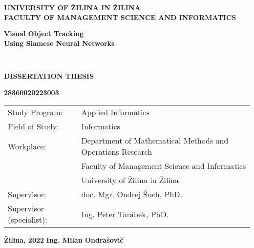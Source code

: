 \begin{titlepage}
    \begin{center}
        \normalsize
        \textbf{UNIVERSITY OF ŽILINA IN ŽILINA}\\
        \textbf{FACULTY OF MANAGEMENT SCIENCE AND INFORMATICS}\\

        \vfill

        \Large
        \textbf{Visual Object Tracking\\Using Siamese Neural Networks}

        \

        \large
        \textbf{DISSERTATION THESIS}

        \textbf{28360020223003}
    \end{center}

    \vfill

    \small

    \begin{tabular}{ll}
        Study Program:           & Applied Informatics                                        \\[-2ex]
        Field of Study:          & Informatics                                                \\[-2ex]
        Workplace:               & Department of Mathematical Methods and Operations Research \\[-2ex]
                                 & Faculty of Management Science and Informatics              \\[-2ex]
                                 & University of Žilina in Žilina                             \\[-2ex]
        Supervisor:              & doc. Mgr. Ondrej Šuch, PhD.                                \\[-2ex]
        Supervisor (specialist): & Ing. Peter Tarábek, PhD.                                   \\[-2ex]
    \end{tabular}

    \normalsize

    \vfill

    \textbf{Žilina, 2022} \hfill \textbf{Ing. Milan Ondrašovič}

\end{titlepage}